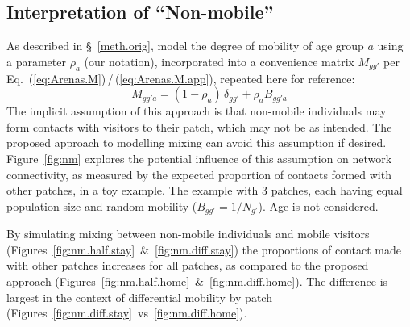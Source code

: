 \subsection{Interpretation of ``Non-mobile''}\label{app.nonmobile}
As described in \S~\ref{meth.orig}, \citet{Arenas2020} model the degree of mobility of age group $a$
using a parameter $\rho_a$ (our notation),
incorporated into a convenience matrix $M_{gg'}$ per Eq.~(\ref{eq:Arenas.M})\,/\,(\ref{eq:Arenas.M.app}),
repeated here for reference:
\begin{equation}\label{eq:Arenas.M.app}
  M_{gg'a} = (1-\rho_a)\,\delta_{gg'} + \rho_a B_{gg'a}
\end{equation}
The implicit assumption of this approach is that
non-mobile individuals may form contacts with visitors to their patch, which may not be as intended.
The proposed approach to modelling mixing can avoid this assumption if desired.
Figure~\ref{fig:nm} explores the potential influence of this assumption on network connectivity,
as measured by the expected proportion of contacts formed with other patches, in a toy example.
The example with 3 patches, each having equal population size and random mobility ($B_{gg'} = 1/N_{g'}$).
Age is not considered.
\par
By simulating mixing between non-mobile individuals and mobile visitors
(Figures~\ref{fig:nm.half.stay}~\&~\ref{fig:nm.diff.stay})
the proportions of contact made with other patches increases for all patches,
as compared to the proposed approach
(Figures~\ref{fig:nm.half.home}~\&~\ref{fig:nm.diff.home}).
The difference is largest in the context of differential mobility by patch
(Figures~\ref{fig:nm.diff.stay}~vs~\ref{fig:nm.diff.home}).
